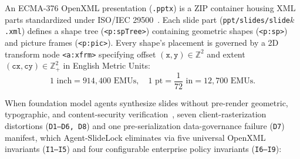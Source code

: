 \documentclass[10pt,journal,compsoc]{IEEEtran}
\begin{document}
An ECMA-376 OpenXML presentation (\texttt{.pptx}) is a ZIP container housing XML parts standardized under ISO/IEC 29500~\cite{ecma376,iso29500}. Each slide part (\texttt{ppt/slides/slide$k$.xml}) defines a shape tree (\texttt{<p:spTree>}) containing geometric shapes (\texttt{<p:sp>}) and picture frames (\texttt{<p:pic>}). Every shape's placement is governed by a 2D transform node \texttt{<a:xfrm>} specifying offset $(\texttt{x}, \texttt{y}) \in \mathbb{Z}^2$ and extent $(\texttt{cx}, \texttt{cy}) \in \mathbb{Z}_+^2$ in English Metric Units:
\begin{equation}
    1\text{ inch} = 914{,}400\text{ EMUs}, \quad 1\text{ pt} = \frac{1}{72}\text{ in} = 12{,}700\text{ EMUs}.
\end{equation}

When foundation model agents synthesize slides without pre-render geometric, typographic, and content-security verification~\cite{fu2022doc2ppt,zhang2023layout,guo2024pptc,zheng2025pptagent,ge2025autopresent}, seven client-rasterization distortions (\texttt{D1--D6, D8}) and one pre-serialization data-governance failure (\texttt{D7}) manifest, which Agent-SlideLock eliminates via five universal OpenXML invariants (\texttt{I1--I5}) and four configurable enterprise policy invariants (\texttt{I6--I9}):
\end{document}
